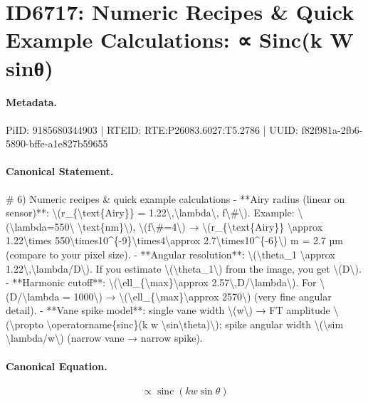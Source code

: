 \section*{ID6717: Numeric Recipes \& Quick Example Calculations: ∝ Sinc(k W sinθ)}
\paragraph{Metadata.}
PiID: 9185680344903 | RTEID: RTE:P26083.6027:T5.2786 | UUID: f82f981a-2fb6-5890-bffe-a1e827b59655

\paragraph{Canonical Statement.}
\# 6) Numeric recipes \& quick example calculations - **Airy radius (linear on sensor)**: \textbackslash{}(r\_\{\textbackslash{}text\{Airy\}\} = 1.22\textbackslash{},\textbackslash{}lambda\textbackslash{}, f\textbackslash{}\#\textbackslash{}). Example: \textbackslash{}(\textbackslash{}lambda=550\textbackslash{} \textbackslash{}text\{nm\}\textbackslash{}), \textbackslash{}(f\textbackslash{}\#=4\textbackslash{}) → \textbackslash{}(r\_\{\textbackslash{}text\{Airy\}\} \textbackslash{}approx 1.22\textbackslash{}times 550\textbackslash{}times10\textasciicircum{}\{-9\}\textbackslash{}times4\textbackslash{}approx 2.7\textbackslash{}times10\textasciicircum{}\{-6\}\textbackslash{}) m = 2.7 µm (compare to your pixel size). - **Angular resolution**: \textbackslash{}(\textbackslash{}theta\_1 \textbackslash{}approx 1.22\textbackslash{},\textbackslash{}lambda/D\textbackslash{}). If you estimate \textbackslash{}(\textbackslash{}theta\_1\textbackslash{}) from the image, you get \textbackslash{}(D\textbackslash{}). - **Harmonic cutoff**: \textbackslash{}(\textbackslash{}ell\_\{\textbackslash{}max\}\textbackslash{}approx 2.57\textbackslash{},D/\textbackslash{}lambda\textbackslash{}). For \textbackslash{}(D/\textbackslash{}lambda = 1000\textbackslash{}) → \textbackslash{}(\textbackslash{}ell\_\{\textbackslash{}max\}\textbackslash{}approx 2570\textbackslash{}) (very fine angular detail). - **Vane spike model**: single vane width \textbackslash{}(w\textbackslash{}) → FT amplitude \textbackslash{}(\textbackslash{}propto \textbackslash{}operatorname\{sinc\}(k w \textbackslash{}sin\textbackslash{}theta)\textbackslash{}); spike angular width \textbackslash{}(\textbackslash{}sim \textbackslash{}lambda/w\textbackslash{}) (narrow vane → narrow spike).

\paragraph{Canonical Equation.}
\[
\propto \operatorname{sinc}(k w \sin\theta)
\]

